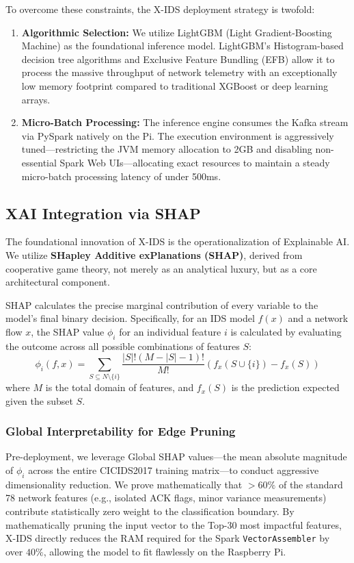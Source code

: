 To overcome these constraints, the X-IDS deployment strategy is twofold:
\begin{enumerate}
    \item \textbf{Algorithmic Selection:} We utilize LightGBM (Light Gradient-Boosting Machine) as the foundational inference model. LightGBM's Histogram-based decision tree algorithms and Exclusive Feature Bundling (EFB) allow it to process the massive throughput of network telemetry with an exceptionally low memory footprint compared to traditional XGBoost or deep learning arrays.
    \item \textbf{Micro-Batch Processing:} The inference engine consumes the Kafka stream via PySpark natively on the Pi. The execution environment is aggressively tuned—restricting the JVM memory allocation to 2GB and disabling non-essential Spark Web UIs—allocating exact resources to maintain a steady micro-batch processing latency of under 500ms.
\end{enumerate}

\subsection{XAI Integration via SHAP}
The foundational innovation of X-IDS is the operationalization of Explainable AI. We utilize \textbf{SHapley Additive exPlanations (SHAP)}, derived from cooperative game theory, not merely as an analytical luxury, but as a core architectural component.

SHAP calculates the precise marginal contribution of every variable to the model's final binary decision. Specifically, for an IDS model $f(x)$ and a network flow $x$, the SHAP value $\phi_i$ for an individual feature $i$ is calculated by evaluating the outcome across all possible combinations of features $S$:
\begin{equation}
    \phi_i(f, x) = \sum_{S \subseteq N \setminus \{i\}} \frac{|S|! (M - |S| - 1)!}{M!} \left( f_x(S \cup \{i\}) - f_x(S) \right)
\end{equation}
where $M$ is the total domain of features, and $f_x(S)$ is the prediction expected given the subset $S$.

\subsubsection{Global Interpretability for Edge Pruning}
Pre-deployment, we leverage Global SHAP values—the mean absolute magnitude of $\phi_i$ across the entire CICIDS2017 training matrix—to conduct aggressive dimensionality reduction. We prove mathematically that $>60\%$ of the standard 78 network features (e.g., isolated ACK flags, minor variance measurements) contribute statistically zero weight to the classification boundary. By mathematically pruning the input vector to the Top-30 most impactful features, X-IDS directly reduces the RAM required for the Spark \texttt{VectorAssembler} by over $40\%$, allowing the model to fit flawlessly on the Raspberry Pi.

